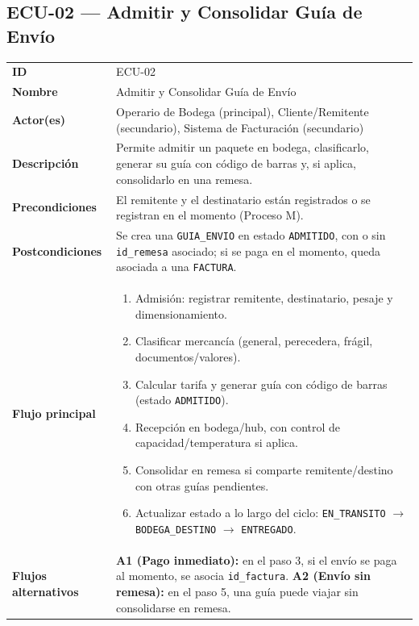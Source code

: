 \documentclass[11pt,a4paper]{article}
\begin{document}
\subsection{ECU-02 --- Admitir y Consolidar Guía de Envío}

{
\begin{longtable}{L{3.2cm} L{11.3cm}}
\toprule
\textbf{ID} & ECU-02 \\
\textbf{Nombre} & Admitir y Consolidar Guía de Envío \\
\textbf{Actor(es)} & Operario de Bodega (principal), Cliente/Remitente (secundario), Sistema de Facturación (secundario) \\
\textbf{Descripción} & Permite admitir un paquete en bodega, clasificarlo, generar su guía con código de barras y, si aplica, consolidarlo en una remesa. \\
\textbf{Precondiciones} & El remitente y el destinatario están registrados o se registran en el momento (Proceso M). \\
\textbf{Postcondiciones} & Se crea una \texttt{GUIA_ENVIO} en estado \texttt{ADMITIDO}, con o sin \texttt{id_remesa} asociado; si se paga en el momento, queda asociada a una \texttt{FACTURA}. \\
\textbf{Flujo principal} &
\begin{enumerate}[nosep,leftmargin=*]
  \item Admisión: registrar remitente, destinatario, pesaje y dimensionamiento.
  \item Clasificar mercancía (general, perecedera, frágil, documentos/valores).
  \item Calcular tarifa y generar guía con código de barras (estado \texttt{ADMITIDO}).
  \item Recepción en bodega/hub, con control de capacidad/temperatura si aplica.
  \item Consolidar en remesa si comparte remitente/destino con otras guías pendientes.
  \item Actualizar estado a lo largo del ciclo: \texttt{EN_TRANSITO} $\rightarrow$ \texttt{BODEGA_DESTINO} $\rightarrow$ \texttt{ENTREGADO}.
\end{enumerate} \\
\textbf{Flujos alternativos} &
\textbf{A1 (Pago inmediato):} en el paso 3, si el envío se paga al momento, se asocia \texttt{id_factura}.\newline
\textbf{A2 (Envío sin remesa):} en el paso 5, una guía puede viajar sin consolidarse en remesa.\newline

\end{longtable}}
\end{document}
